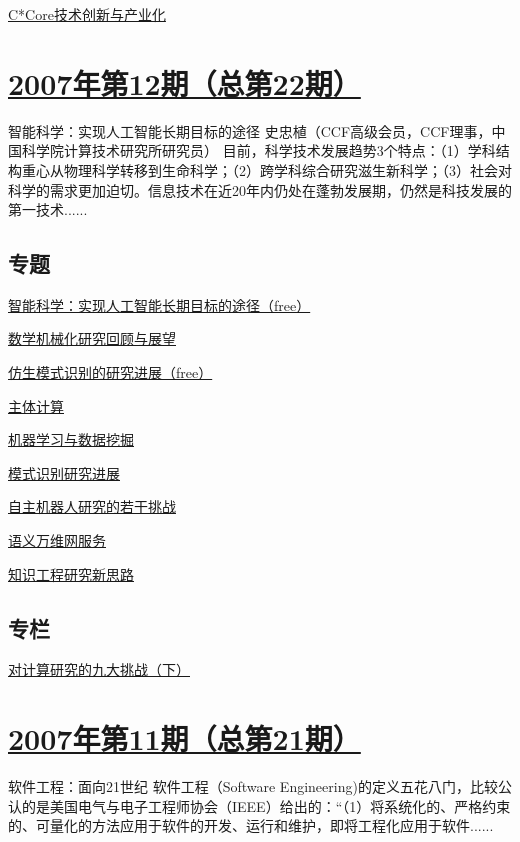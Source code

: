 \documentclass[a4paper]{article}
\begin{document}
\href{http://history.ccf.org.cn/resources/1190201776262/2010/04/15/023073.pdf}{C*Core技术创新与产业化}


\section{\href{http://history.ccf.org.cn/sites/ccf/jsjtbbd.jsp?contentId=2542567628983}{\textbf{2007年第12期（总第22期）}}}
智能科学：实现人工智能长期目标的途径 史忠植（CCF高级会员，CCF理事，中国科学院计算技术研究所研究员）  
目前，科学技术发展趋势3个特点：（1）学科结构重心从物理科学转移到生命科学；（2）跨学科综合研究滋生新科学；（3）社会对科学的需求更加迫切。信息技术在近20年内仍处在蓬勃发展期，仍然是科技发展的第一技术......
\subsection{专题}
\href{http://history.ccf.org.cn/resources/1190201776262/2010/04/15/022010.pdf}{智能科学：实现人工智能长期目标的途径（free）}

\href{http://history.ccf.org.cn/resources/1190201776262/2010/04/15/022013.pdf}{数学机械化研究回顾与展望}

\href{http://history.ccf.org.cn/resources/1190201776262/2010/04/15/022018.pdf}{仿生模式识别的研究进展（free）}

\href{http://history.ccf.org.cn/resources/1190201776262/2010/04/15/022026.pdf}{主体计算}

\href{http://history.ccf.org.cn/resources/1190201776262/2010/04/15/022035.pdf}{机器学习与数据挖掘}

\href{http://history.ccf.org.cn/resources/1190201776262/2010/04/15/022045.pdf}{模式识别研究进展}

\href{http://history.ccf.org.cn/resources/1190201776262/2010/04/15/022053.pdf}{自主机器人研究的若干挑战}

\href{http://history.ccf.org.cn/resources/1190201776262/2010/04/15/022066.pdf}{语义万维网服务}

\href{http://history.ccf.org.cn/resources/1190201776262/2010/04/15/022073.pdf}{知识工程研究新思路}

\subsection{专栏}
\href{http://history.ccf.org.cn/resources/1190201776262/2010/04/15/022078.pdf}{对计算研究的九大挑战（下）}


\section{\href{http://history.ccf.org.cn/sites/ccf/jsjtbbd.jsp?contentId=2542567628980}{\textbf{2007年第11期（总第21期）}}}
软件工程：面向21世纪 软件工程（Software Engineering)的定义五花八门，比较公认的是美国电气与电子工程师协会（IEEE）给出的：“（1）将系统化的、严格约束的、可量化的方法应用于软件的开发、运行和维护，即将工程化应用于软件......
\end{document}
